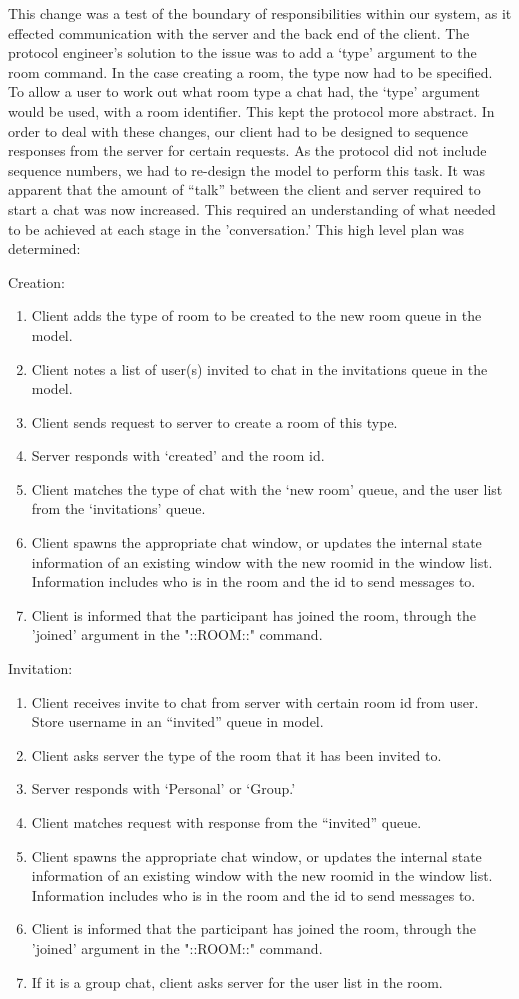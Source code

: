 This change was a test of the boundary of responsibilities within our system, as it effected communication with the server and the back end of the client. The protocol engineer's solution to the issue was to add a `type' argument to the room command. In the case creating a room, the type now had to be specified. To allow a user to work out what room type a chat had, the `type' argument would be used, with a room identifier. This kept the protocol more abstract. In order to deal with these changes, our client had to be designed to sequence responses from the server for certain requests. As the protocol did not include sequence numbers, we had to re-design the model to perform this task. It was apparent that the amount of ``talk'' between the client and server required to start a chat was now increased. This required an understanding of what needed to be achieved at each stage in the 'conversation.' This high level plan was determined:

Creation:
\begin{enumerate}
\item Client adds the type of room to be created to the new room queue in the model.
\item Client notes a list of user(s) invited to chat in the invitations queue in the model.
\item Client sends request to server to create a room of this type.
\item Server responds with `created' and the room id.
\item Client matches the type of chat with the `new room' queue, and the user list from the `invitations' queue.
\item Client spawns the appropriate chat window, or updates the internal state information of an existing window with the new roomid in the window list. Information includes who is in the room and the id to send messages to.
\item Client is informed that the participant has joined the room, through the 'joined' argument in the "::ROOM::" command.
\end {enumerate}

Invitation:
\begin{enumerate}
\item Client receives invite to chat from server with certain room id from user. Store username in an ``invited'' queue in model.  
\item Client asks server the type of the room that it has been invited to.
\item Server responds with `Personal' or `Group.'
\item Client matches request with response from the ``invited'' queue.
\item Client spawns the appropriate chat window, or updates the internal state information of an existing window with the new roomid in the window list. Information includes who is in the room and the id to send messages to.
\item Client is informed that the participant has joined the room, through the 'joined' argument in the "::ROOM::" command.
\item If it is a group chat, client asks server for the user list in the room.
\end{enumerate}

